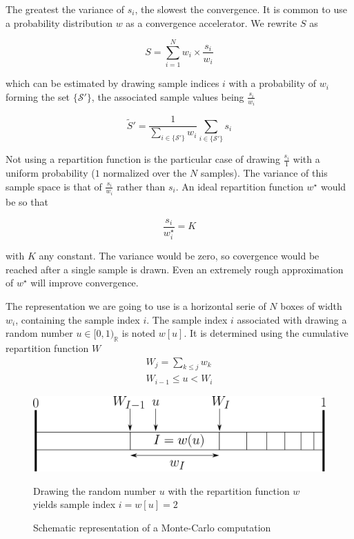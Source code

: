 \documentclass[./thesis.tex]{subfiles}
\begin{document}
The greatest the variance of $s_i$, the slowest the convergence. It is common to use a probability distribution $w$ as a convergence accelerator. We rewrite $S$ as 

$$S = \sum_{i=1}^N {w_i \times \frac{s_i}{w_i}}$$

which can be estimated by drawing sample indices $i$ with a probability of $w_i$ forming the set $\{\mathcal{S'}\}$, the associated sample values being $\frac{s_i}{w_i}$

$$\tilde S' = \frac{1} {\sum_{i \in \{ \mathcal{S'} \} } w_i} \sum_{i \in \{\mathcal{S'}\}} {s_i}$$

Not using a repartition function is the particular case of drawing $\frac{s_i}{1}$ with a uniform probability ($1$ normalized over the $N$ samples). The variance of this sample space is that of $\frac{s_i}{w_i}$ rather than $s_i$. An ideal repartition function $w^\star$ would be so that

$$\frac{s_i}{w^\star_i} = K$$

with $K$ any constant. The variance would be zero, so covergence would be reached after a single sample is drawn. Even an extremely rough approximation of $w^\star$ will improve convergence.



The representation we are going to use is a horizontal serie of $N$ boxes of width $w_i$, containing the sample index $i$.
The sample index $i$ associated with drawing a random number $u \in [0,1)_\mathbb{R}$ is noted $w[u]$. It is determined using the cumulative repartition function $W$
\begin{align}
W_j = \sum_{k \leq j} w_k \\
W_{i-1} \leq u < W_i
\end{align}

\begin{figure}[h!]
	\begin{center}
		\includegraphics[width=0.9\columnwidth]{figures/pt2/mc_representation}
		\caption{Schematic representation of a Monte-Carlo computation}
		\label{fig:mc_representation}
		Drawing the random number $u$ with the repartition function $w$ yields sample index $i=w[u] = 2$
	\end{center}
\end{figure}
\end{document}
